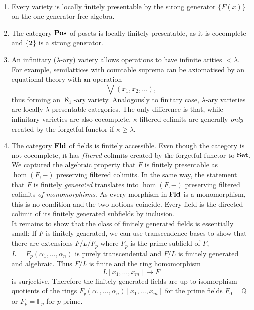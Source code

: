 \begin{Example}\
\begin{enumerate}
\item Every variety is locally finitely presentable by the strong generator $\{ F(x) \}$ on the one-generator free algebra.

\item The category $\mathbf{Pos}$ of posets is locally finitely presentable, as it is cocomplete and $\{\mathbf 2\}$ is a strong generator. 

\item An infinitary ($\lambda$-ary) variety allows operations to have infinite arities $< \lambda$. For example, semilattices with countable suprema can be axiomatised by an equational theory with an operation
\[ \bigvee(x_1, x_2, \ldots), \]
thus forming an $\aleph_1$-ary variety. Analogously to finitary case, $\lambda$-ary varieties are locally $\lambda$-presentable categories. The only difference is that, while infinitary varieties are also cocomplete, $\kappa$-filtered colimits are generally \emph{only} created by the forgetful functor if $\kappa \geq \lambda$.

\item The category $\mathbf{Fld}$ of fields is finitely accessible. Even though the category is not cocomplete, it has \emph{filtered} colimits created by the forgetful functor to $\mathbf{Set}$. \\

We captured the algebraic property that $F$ is finitely presentable as $\hom(F,-)$ preserving filtered colimits. In the same way, the statement that $F$ is finitely \emph{generated} translates into $\hom(F,-)$ preserving filtered colimits \emph{of monomorphisms}. As every morphism in $\mathbf{Fld}$ is a monomorphism, this is no condition and the two notions coincide. Every field is the directed colimit of its finitely generated subfields by inclusion. \\

It remains to show that the class of finitely generated fields is essentially small: If $F$ is finitely generated, we can use transcendence bases to show that there are extensions $F/L/F_p$ where $F_p$ is the prime subfield of $F$, $L=F_p(\alpha_1,\ldots,\alpha_n)$ is purely transcendental and $F/L$ is finitely generated and algebraic. Thus $F/L$ is finite and the ring homomorphism
\[ L[x_1,\ldots,x_m] \to F \]
is surjective. Therefore the finitely generated fields are up to isomorphism quotients of the rings $F_p(\alpha_1, \ldots,\alpha_n)[x_1,\ldots,x_m]$ for the prime fields $F_0 = \mathbb Q$ or $F_p = \mathbb F_p$ for $p$ prime.
\end{enumerate}
\end{Example}

